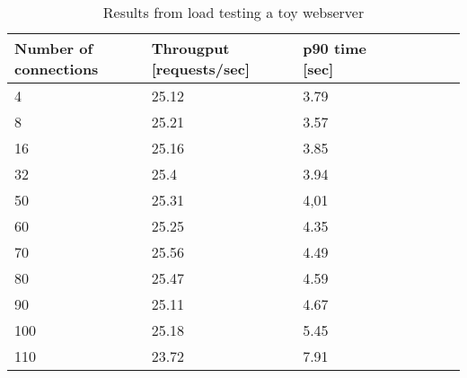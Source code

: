 %
\begin{table}[h]
\footnotesize
\centering
{\renewcommand{\arraystretch}{1.3}
\begin{tabular}{lllllllll}
    \toprule
    Number of connections & Througput [requests/sec] & p90 time [sec] \\
    \midrule
    4 & 25.12 & 3.79 \\
    8 & 25.21 & 3.57 \\
    16 & 25.16 & 3.85 \\
    32 & 25.4 & 3.94 \\
    50 & 25.31 & 4,01 \\
    60 & 25.25 & 4.35 \\
    70 & 25.56 & 4.49 \\
    80 & 25.47 & 4.59 \\
    90 & 25.11 & 4.67 \\
    100 & 25.18 & 5.45 \\
    110 & 23.72 & 7.91 \\
    \bottomrule
\end{tabular}}
\caption{Results from load testing a toy webserver}
\label{tab:webserver}
\end{table}